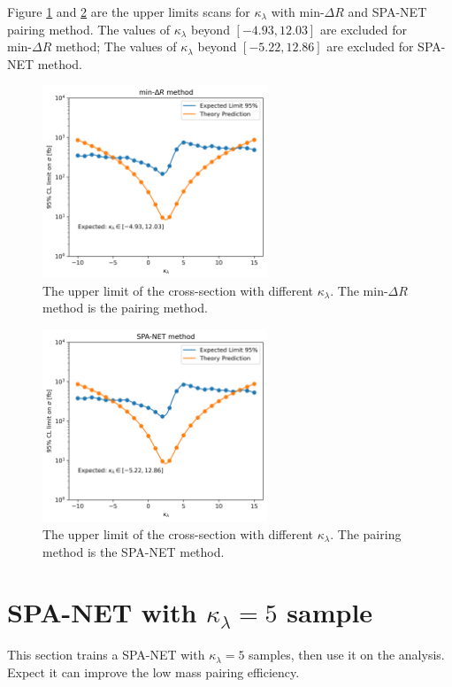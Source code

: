 \documentclass[12pt]{article}
\begin{document}
		Figure \ref{fig:CL_limit_kappa_min_dR} and \ref{fig:CL_limit_kappa_SPANET} are the upper limits scans for $\kappa_\lambda$ with $\text{min-}\Delta R$ and SPA-NET pairing method. The values of $\kappa_\lambda$ beyond $\left[ -4.93, 12.03 \right]$ are excluded for $\text{min-}\Delta R$ method; The values of $\kappa_\lambda$ beyond $\left[ -5.22, 12.86 \right]$ are excluded for SPA-NET method.
		\begin{figure}[htpb]
			\centering
			\includegraphics[width=0.6\textwidth]{CL_limit_kappa_min_dR.png}
			\caption{The upper limit of the cross-section with different $\kappa_\lambda$. The $\text{min-}\Delta R$ method is the pairing method.}
			\label{fig:CL_limit_kappa_min_dR}
		\end{figure}
		\begin{figure}[htpb]
			\centering
			\includegraphics[width=0.6\textwidth]{CL_limit_kappa_SPANET.png}
			\caption{The upper limit of the cross-section with different $\kappa_\lambda$. The pairing method is the SPA-NET method.}
			\label{fig:CL_limit_kappa_SPANET}
		\end{figure}

\section{SPA-NET with \texorpdfstring{$\kappa_\lambda=5$}{kappa=5} sample}%
\label{sec:spa_net_with_kappa_5_sample}
	This section trains a SPA-NET with $\kappa_\lambda=5$ samples, then use it on the analysis. Expect it can improve the low mass pairing efficiency.
\end{document}
